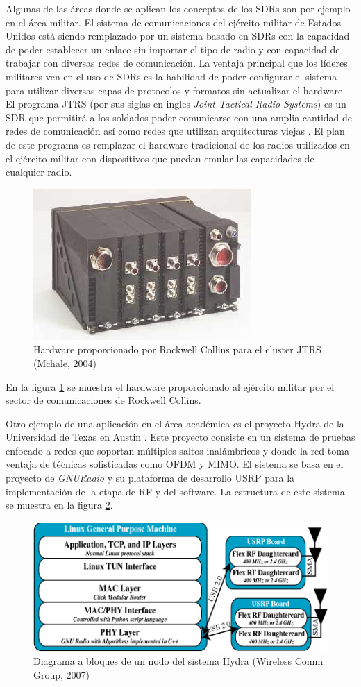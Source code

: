 Algunas de las \'areas donde se aplican los conceptos de los SDRs son por
ejemplo en el \'area militar. El sistema de comunicaciones del ej\'ercito
militar de Estados Unidos est\'a siendo remplazado por un sistema basado en SDRs
con la capacidad de poder establecer un enlace sin importar el tipo de radio y
con capacidad de trabajar con diversas redes de comunicaci\'on. La ventaja
principal que los l\'ideres militares ven en el uso de SDRs es la habilidad de
poder configurar el sistema para utilizar diversas capas de protocolos y
formatos sin actualizar el hardware. El programa JTRS (por sus siglas en ingles
\emph{Joint Tactical Radio Systems}) es un SDR que permitir\'a a los soldados
poder comunicarse con una amplia cantidad de redes de comunicaci\'on as\'i como
redes que utilizan arquitecturas viejas \cite{mchale}. El plan de
este programa es remplazar el hardware tradicional de los radios utilizados en
el ej\'ercito militar con dispositivos que puedan emular las capacidades de
cualquier radio.

\begin{figure}[hpt]
\centering
	\includegraphics[scale=0.7]{figs/jtrs}
	\caption{Hardware proporcionado por Rockwell Collins para el cluster JTRS
	(Mchale, 2004)}
	\label{fig:jtrs}
\end{figure}

En la figura \ref{fig:jtrs} se muestra el hardware proporcionado al ej\'ercito
militar por el sector de comunicaciones de Rockwell Collins.

Otro ejemplo de una aplicaci\'on en el \'area acad\'emica es el proyecto Hydra
de la Universidad de Texas en Austin \cite{hydra}. Este proyecto consiste en un
sistema de pruebas enfocado a redes que soportan m\'ultiples saltos
inal\'ambricos y donde la red toma ventaja de t\'ecnicas sofisticadas como OFDM
y MIMO. El sistema se basa en el proyecto de \emph{GNURadio} y su plataforma de
desarrollo USRP \cite{ettus} para la implementaci\'on de la etapa de RF y del
software. La estructura de este sistema se muestra en la figura \ref{fig:hydra}.

\begin{figure}[hpt]
\centering
	\includegraphics[scale=0.7]{figs/hydra}
	\vspace{0.5in}
	\caption{Diagrama a bloques de un nodo del sistema Hydra (Wireless
	Comm Group, 2007)}
	\label{fig:hydra}
\end{figure}
